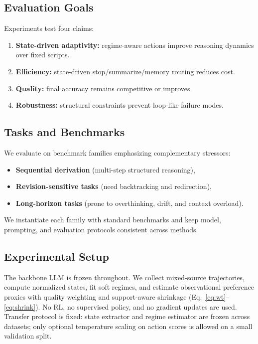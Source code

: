 \documentclass{article}
\begin{document}
\subsection{Evaluation Goals}
Experiments test four claims:
\begin{enumerate}[leftmargin=1.3em, itemsep=0.2em]
    \item \textbf{State-driven adaptivity:} regime-aware actions improve reasoning dynamics over fixed scripts.
    \item \textbf{Efficiency:} state-driven stop/summarize/memory routing reduces cost.
    \item \textbf{Quality:} final accuracy remains competitive or improves.
    \item \textbf{Robustness:} structural constraints prevent loop-like failure modes.
\end{enumerate}

\subsection{Tasks and Benchmarks}
We evaluate on benchmark families emphasizing complementary stressors:
\begin{itemize}[leftmargin=1.3em, itemsep=0.2em]
    \item \textbf{Sequential derivation} (multi-step structured reasoning),
    \item \textbf{Revision-sensitive tasks} (need backtracking and redirection),
    \item \textbf{Long-horizon tasks} (prone to overthinking, drift, and context overload).
\end{itemize}
We instantiate each family with standard benchmarks and keep model, prompting, and evaluation protocols consistent across methods.

\subsection{Experimental Setup}
The backbone LLM is frozen throughout. We collect mixed-source trajectories, compute normalized states, fit soft regimes, and estimate observational preference proxies with quality weighting and support-aware shrinkage (Eq.~\eqref{eq:wt}--\eqref{eq:shrink}). No RL, no supervised policy, and no gradient updates are used.
Transfer protocol is fixed: state extractor and regime estimator are frozen across datasets; only optional temperature scaling on action scores is allowed on a small validation split.
\end{document}
